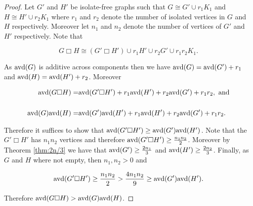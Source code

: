 \documentclass[11pt]{article}
\newcommand{\avd}{\text{\rm{avd}}}
\begin{document}
\begin{proof}

Let $G'$ and $H'$ be isolate-free graphs such that $G \cong G' \cup r_1 K_1$ and  $H \cong H' \cup r_2 K_1$ where $r_1$ and $r_2$ denote the number of isolated vertices in $G$ and $H$ respectively. Moreover let $n_1$ and $n_2$ denote the number of vertices of $G'$ and $H'$ respectively. Note that

$$G \Box H \cong (G' \Box H') \cup r_1 H' \cup r_2 G' \cup r_1r_2K_1.$$

\noindent As $\avd(G)$ is additive across components then we have $\avd(G)=\avd(G')+r_1$ and $\avd(H)=\avd(H')+r_2$. Moreover

\begin{align*}
\avd(G \Box H) =& \avd(G' \Box H') + r_1 \avd(H')+ r_2 \avd(G')+ r_1r_2,\text{ and} \\ \\
\avd(G)\avd(H) = &  \avd(G')\avd(H') + r_1 \avd(H')+ r_2 \avd(G')+ r_1r_2. \\
\end{align*}

\noindent Therefore it suffices to show that $\avd(G' \Box H') \geq  \avd(G')\avd(H')$. Note that the $G' \Box H'$ has $n_1n_2$ vertices and therefore $\avd(G' \Box H') \geq \frac{n_1n_2}{2}$. Moreover by Theorem \ref{thm:2n/3} we have that $\avd(G') \geq \frac{2n_1}{3}$ and $\avd(H') \geq \frac{2n_2}{3}$. Finally, as $G$ and $H$ where not empty, then $n_1,n_2>0$ and

 $$\avd(G' \Box H') \geq \frac{n_1n_2}{2} > \frac{4n_1n_2}{9} \geq \avd(G')\avd(H').$$
 
\noindent Therefore $\avd(G \Box H) > \avd(G)\avd(H)$.
\end{proof}


\end{document}
